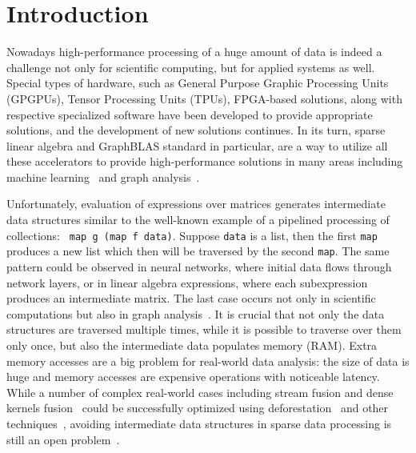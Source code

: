\section{Introduction}

Nowadays high-performance processing of a huge amount of data is indeed a challenge not only for scientific computing, but for applied systems as well.
Special types of hardware, such as General Purpose Graphic Processing Units (GPGPUs), Tensor Processing Units (TPUs), FPGA-based solutions, along with respective specialized software have been developed to provide appropriate solutions, and the development of new solutions continues.
In its turn, sparse linear algebra and GraphBLAS standard in particular, are a way to utilize all these accelerators to provide high-performance solutions in many areas including machine learning~\cite{Kepner2017} and graph analysis~\cite{graphblast}.

Unfortunately, evaluation of expressions over matrices generates intermediate data structures similar to the well-known example of a pipelined processing of collections: \verb| map g (map f data)|. Suppose \verb|data| is a list, then the first \verb|map| produces a new list which then will be traversed by the second \verb|map|. The same pattern could be observed in neural networks, where initial data flows through network layers, or in linear algebra expressions, where each subexpression produces an intermediate matrix. 
The last case occurs not only in scientific computations but also in graph analysis~\cite{graphblast}.
It is crucial that not only the data structures are traversed multiple times, while it is possible to traverse over them only once, but also the intermediate data populates memory (RAM).
Extra memory accesses are a big problem for real-world data analysis: the size of data is huge and memory accesses are expensive operations with noticeable latency. %
While a number of complex real-world cases including stream fusion and dense kernels fusion~\cite{fusion-boosting-memory-computations} could be successfully optimized using deforestation~\cite{wadler-deforestation-ho} and other techniques~\cite{StreamFus}, avoiding intermediate data structures in sparse data processing is still an open problem~\cite{graphblast}.
